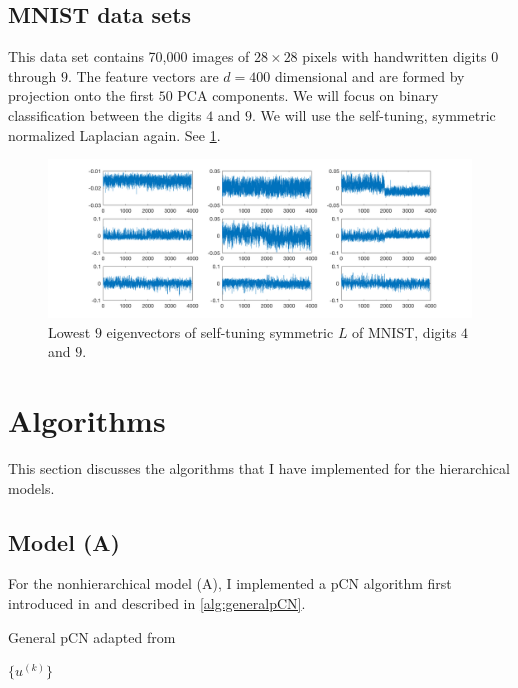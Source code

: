 \documentclass{siamart1116}
\begin{document}
    \subsection{MNIST data sets}
        This data set contains 70,000 images of $28 \times 28$ pixels with handwritten digits $0$ through $9$. The feature vectors are $d=400$ dimensional and are formed by projection onto the first $50$ PCA components. We will focus on binary classification between the digits $4$ and $9$. We will use the self-tuning, symmetric normalized Laplacian again. See \cref{fig:mnist_spec}.

        \begin{figure}[!htb]
        \caption{\label{fig:mnist_spec} Lowest $9$ eigenvectors of self-tuning symmetric $L$ of MNIST, digits $4$ and $9$.}
        \includegraphics[width=\linewidth]{laplacians/mnist_laplacian.png}
        \end{figure}

\section{Algorithms}
    This section discusses the algorithms that I have implemented for the hierarchical models.

    \subsection{Model (A)}
        For the nonhierarchical model (A), I implemented a pCN algorithm first introduced in \cite{BeRoStVo08} and described in \cref{alg:generalpCN}.

        \begin{algorithm}
        \caption{General pCN adapted from \cite{CoRoStWh13}}
        \label{alg:generalpCN}
        \begin{algorithmic}[1]
        \EndFor
        \State \Return $\{u^{(k)}\}$
        \end{algorithmic}
        \end{algorithm}
\end{document}
